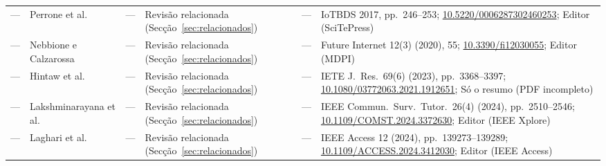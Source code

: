 {\begin{longtable}{@{}lL{2.2cm}cL{4.4cm}L{3.0cm}L{3.6cm}@{}}
\midrule
--- & Perrone et al.~\cite{perrone2017mirai} & --- & Revisão relacionada (Secção~\ref{sec:relacionados}) & --- & IoTBDS 2017, pp.~246--253; \url{10.5220/0006287302460253}; Editor (SciTePress) \\
--- & Nebbione e Calzarossa~\cite{nebbione2020security} & --- & Revisão relacionada (Secção~\ref{sec:relacionados}) & --- & Future Internet 12(3) (2020), 55; \url{10.3390/fi12030055}; Editor (MDPI) \\
--- & Hintaw et al.~\cite{hintaw2023mqtt} & --- & Revisão relacionada (Secção~\ref{sec:relacionados}) & --- & IETE J.\ Res.\ 69(6) (2023), pp.~3368--3397; \url{10.1080/03772063.2021.1912651}; Só o resumo (PDF incompleto) \\
--- & Lakshmi\-na\-rayana et al.~\cite{lakshminarayana2024securing} & --- & Revisão relacionada (Secção~\ref{sec:relacionados}) & --- & IEEE Commun.\ Surv.\ Tutor.\ 26(4) (2024), pp.~2510--2546; \url{10.1109/COMST.2024.3372630}; Editor (IEEE Xplore) \\
--- & Laghari et al.~\cite{laghari2024securing} & --- & Revisão relacionada (Secção~\ref{sec:relacionados}) & --- & IEEE Access 12 (2024), pp.~139273--139289; \url{10.1109/ACCESS.2024.3412030}; Editor (IEEE Access) \\
\end{longtable}
}

